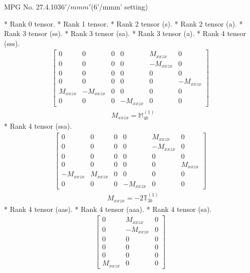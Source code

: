 \documentclass[fleqn,8pt,landscape]{jsarticle}
\begin{document}
\setcounter{MaxMatrixCols}{32}

\renewcommand{\tablename}{Table~}
\renewcommand{\figurename}{Figure~}
\begin{center}
\LARGE
MPG No. 27.4.103\quad$6'/mmm'$\quad(6'/mmm' setting)
\end{center}
* Rank 0 tensor.
* Rank 1 tensor.
* Rank 2 tensor (s).
* Rank 2 tensor (a).
* Rank 3 tensor (ss).
* Rank 3 tensor (sa).
* Rank 3 tensor (a).
* Rank 4 tensor (sss).
\begin{align*}
\begin{bmatrix} 0 & 0 & 0 & 0 & M_{xxzx} & 0 \\ 0 & 0 & 0 & 0 & - M_{xxzx} & 0 \\ 0 & 0 & 0 & 0 & 0 & 0 \\ 0 & 0 & 0 & 0 & 0 & - M_{xxzx} \\ M_{xxzx} & - M_{xxzx} & 0 & 0 & 0 & 0 \\ 0 & 0 & 0 & - M_{xxzx} & 0 & 0 \end{bmatrix}
\end{align*}
\begin{align*}
& M_{xxzx} = \mathbb{M}_{4b}^{(1)}
\end{align*}
* Rank 4 tensor (ssa).
\begin{align*}
\begin{bmatrix} 0 & 0 & 0 & 0 & M_{xxzx} & 0 \\ 0 & 0 & 0 & 0 & - M_{xxzx} & 0 \\ 0 & 0 & 0 & 0 & 0 & 0 \\ 0 & 0 & 0 & 0 & 0 & M_{xxzx} \\ - M_{xxzx} & M_{xxzx} & 0 & 0 & 0 & 0 \\ 0 & 0 & 0 & - M_{xxzx} & 0 & 0 \end{bmatrix}
\end{align*}
\begin{align*}
& M_{xxzx} = - 2 \mathbb{T}_{3b}^{(1)}
\end{align*}
* Rank 4 tensor (aas).
* Rank 4 tensor (aaa).
* Rank 4 tensor (sa).
\begin{align*}
\begin{bmatrix} 0 & M_{xxzx} & 0 \\ 0 & - M_{xxzx} & 0 \\ 0 & 0 & 0 \\ 0 & 0 & 0 \\ 0 & 0 & 0 \\ M_{xxzx} & 0 & 0 \end{bmatrix}
\end{align*}
\end{document}

